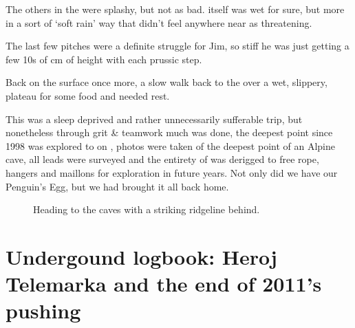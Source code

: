 The others in the  were splashy, but not as bad. 
itself was wet for sure, but more in a sort of `soft rain' way that
didn't feel anywhere near as threatening.

The last few pitches were a definite struggle for Jim, so stiff he was
just getting a few 10s of cm of height with each prussic step.

Back on the surface once more, a slow walk back to the  over a wet,
slippery, plateau for some food and needed rest.

This was a sleep deprived and rather unnecessarily sufferable trip, but
nonetheless through grit \& teamwork much was done, the deepest point
since 1998 was explored to on , photos were taken of the deepest
point of an Alpine cave, all leads were surveyed and the entirety of
 was derigged to free rope, hangers and maillons for
exploration in future years. Not only did we have our Penguin's Egg, but
we had brought it all back home.



\newpage

\begin{figure}[t!]
\checkoddpage \ifoddpage \forcerectofloat \else \forceversofloat \fi
    \centering
        \caption{Heading to the caves with a striking ridgeline behind. } \label{plateau tjasa}
\end{figure}

\section{Undergound logbook: Heroj Telemarka and the end of 2011's pushing}

